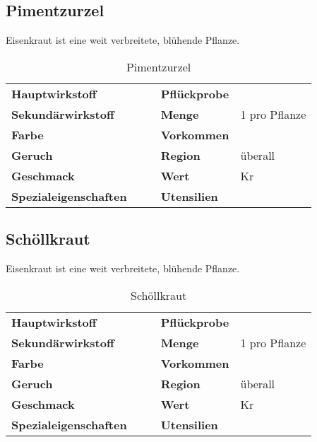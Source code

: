 \subsection{Pimentzurzel}
Eisenkraut ist eine weit verbreitete, blühende Pflanze. 

\begin{table}[h]
\begin{center}
\begin{tabular}{|l|l|p{1cm}|l|l|}
	\cline{1-2} \cline{4-5}
	\textbf{Hauptwirkstoff} &  && \textbf{Pflückprobe} &  \\ \cline{1-2} \cline{4-5}
	\textbf{Sekundärwirkstoff} &  && \textbf{Menge} & 1 pro Pflanze \\ \cline{1-2} \cline{4-5}
	\textbf{Farbe} &  && \textbf{Vorkommen} &  \\ \cline{1-2} \cline{4-5}
	\textbf{Geruch} &  && \textbf{Region} & überall \\ \cline{1-2} \cline{4-5}
	\textbf{Geschmack} &  && \textbf{Wert} & Kr \\ \cline{1-2} \cline{4-5}
	\textbf{Spezialeigenschaften} &  && \textbf{Utensilien} &  \\ \cline{1-2} \cline{4-5}
\end{tabular}
\end{center}
\caption{Pimentzurzel}
\label{tab:pimentzurzel}
\end{table}


\subsection{Schöllkraut}
Eisenkraut ist eine weit verbreitete, blühende Pflanze. 

\begin{table}[h]
\begin{center}
\begin{tabular}{|l|l|p{1cm}|l|l|}
	\cline{1-2} \cline{4-5}
	\textbf{Hauptwirkstoff} &  && \textbf{Pflückprobe} &  \\ \cline{1-2} \cline{4-5}
	\textbf{Sekundärwirkstoff} &  && \textbf{Menge} & 1 pro Pflanze \\ \cline{1-2} \cline{4-5}
	\textbf{Farbe} &  && \textbf{Vorkommen} &  \\ \cline{1-2} \cline{4-5}
	\textbf{Geruch} &  && \textbf{Region} & überall \\ \cline{1-2} \cline{4-5}
	\textbf{Geschmack} &  && \textbf{Wert} & Kr \\ \cline{1-2} \cline{4-5}
	\textbf{Spezialeigenschaften} &  && \textbf{Utensilien} &  \\ \cline{1-2} \cline{4-5}
\end{tabular}
\end{center}
\caption{Schöllkraut}
\label{tab:schoellkraut}
\end{table}


